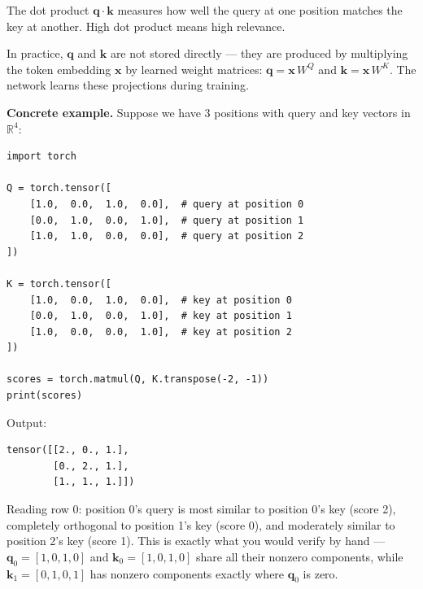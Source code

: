The dot product $\mathbf{q} \cdot \mathbf{k}$ measures how well the query at one position matches the key at another. High dot product means high relevance.

In practice, $\mathbf{q}$ and $\mathbf{k}$ are not stored directly --- they are produced by multiplying the token embedding $\mathbf{x}$ by learned weight matrices: $\mathbf{q} = \mathbf{x}\, W^Q$ and $\mathbf{k} = \mathbf{x}\, W^K$. The network learns these projections during training.

\textbf{Concrete example.} Suppose we have 3 positions with query and key vectors in $\mathbb{R}^4$:

\demotag
\begin{lstlisting}
import torch

Q = torch.tensor([
    [1.0,  0.0,  1.0,  0.0],  # query at position 0
    [0.0,  1.0,  0.0,  1.0],  # query at position 1
    [1.0,  1.0,  0.0,  0.0],  # query at position 2
])

K = torch.tensor([
    [1.0,  0.0,  1.0,  0.0],  # key at position 0
    [0.0,  1.0,  0.0,  1.0],  # key at position 1
    [1.0,  0.0,  0.0,  1.0],  # key at position 2
])

scores = torch.matmul(Q, K.transpose(-2, -1))
print(scores)
\end{lstlisting}

Output:

\outputtag
\begin{lstlisting}
tensor([[2., 0., 1.],
        [0., 2., 1.],
        [1., 1., 1.]])
\end{lstlisting}

Reading row 0: position 0's query is most similar to position 0's key (score 2), completely orthogonal to position 1's key (score 0), and moderately similar to position 2's key (score 1). This is exactly what you would verify by hand --- $\mathbf{q}_0 = [1, 0, 1, 0]$ and $\mathbf{k}_0 = [1, 0, 1, 0]$ share all their nonzero components, while $\mathbf{k}_1 = [0, 1, 0, 1]$ has nonzero components exactly where $\mathbf{q}_0$ is zero.


